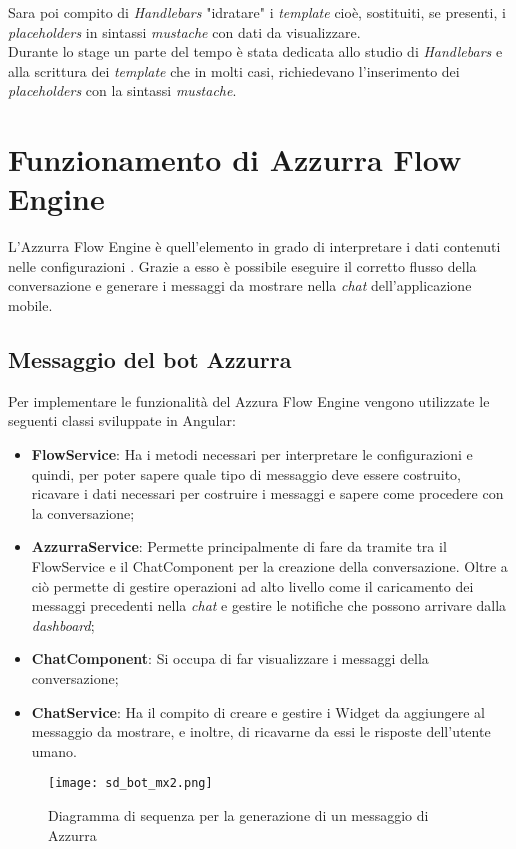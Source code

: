  Sara poi compito di \emph{Handlebars} "idratare" i \emph{template} cioè,  sostituiti, se presenti, i \emph{placeholders} in sintassi \emph{mustache} con dati da visualizzare.\\

 Durante lo stage un parte del tempo è stata dedicata allo studio di \emph{Handlebars} e alla scrittura dei \emph{template} che in molti casi, richiedevano l'inserimento dei \emph{placeholders} con la sintassi \emph{mustache}.
 

\section{Funzionamento di Azzurra Flow Engine}
L'Azzurra Flow Engine è quell'elemento in grado di interpretare i dati contenuti nelle configurazioni . Grazie a esso è possibile eseguire il corretto flusso della conversazione e generare i messaggi da mostrare nella \emph{chat} dell'applicazione mobile. 
\subsection{Messaggio del bot Azzurra}
Per implementare le funzionalità del Azzura Flow Engine vengono utilizzate le seguenti classi sviluppate in Angular:
\begin{itemize}
	\item \textbf{FlowService}: Ha i metodi necessari per interpretare le configurazioni  e quindi, per poter sapere quale tipo di messaggio deve essere costruito, ricavare i dati necessari per costruire i messaggi e sapere come procedere con la conversazione;
	\item \textbf{AzzurraService}: Permette principalmente di fare da tramite tra il FlowService e il ChatComponent per la creazione della conversazione. Oltre a ciò permette di gestire operazioni ad alto livello come il caricamento dei messaggi precedenti nella \emph{chat} e gestire le notifiche che possono arrivare dalla \emph{dashboard};
	\item \textbf{ChatComponent}: Si occupa di far visualizzare i messaggi della conversazione;
	\item \textbf{ChatService}: Ha il compito di creare e gestire i Widget da aggiungere al messaggio da mostrare, e inoltre, di ricavarne da essi le risposte dell'utente umano.
\end{itemize}

\begin{figure}[htbp]
	\centering
	\texttt{[image: sd\_bot\_mx2.png]}
	\caption{Diagramma di sequenza per la generazione di un messaggio di Azzurra}\label{fig:mxBot}
\end{figure}


